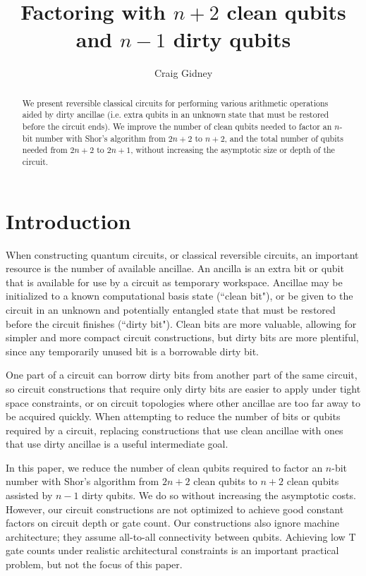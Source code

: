 \documentclass[twocolumn,longbibliography]{quantumarticle}
\title{Factoring with $n+2$ clean qubits and $n-1$ dirty qubits}
\author{Craig Gidney}
\affiliation{Google, Santa Barbara, CA 93117, USA}
\begin{document}
\maketitle

\begin{abstract}
We present reversible classical circuits for performing various arithmetic operations aided by dirty ancillae (i.e. extra qubits in an unknown state that must be restored before the circuit ends).
We improve the number of clean qubits needed to factor an $n$-bit number with Shor's algorithm \cite{Shor1999} from $2n+2$ \cite{takahashi2006, haner2016} to $n+2$, and the total number of qubits needed from $2n+2$ to $2n+1$, without increasing the asymptotic size or depth of the circuit.
\end{abstract}

\section{Introduction} \label{sec:introduction}

When constructing quantum circuits, or classical reversible circuits, an important resource is the number of available ancillae.
An ancilla is an extra bit or qubit that is available for use by a circuit as temporary workspace.
Ancillae may be initialized to a known computational basis state (``clean bit"), or be given to the circuit in an unknown and potentially entangled state that must be restored before the circuit finishes (``dirty bit").
Clean bits are more valuable, allowing for simpler and more compact circuit constructions, but dirty bits are more plentiful, since any temporarily unused bit is a borrowable dirty bit.

One part of a circuit can borrow dirty bits from another part of the same circuit, so circuit constructions that require only dirty bits are easier to apply under tight space constraints, or on circuit topologies where other ancillae are too far away to be acquired quickly.
When attempting to reduce the number of bits or qubits required by a circuit, replacing constructions that use clean ancillae with ones that use dirty ancillae is a useful intermediate goal.

In this paper, we reduce the number of clean qubits required to factor an $n$-bit number with Shor's algorithm from $2n+2$ clean qubits \cite{takahashi2006, haner2016} to $n+2$ clean qubits assisted by $n-1$ dirty qubits.
We do so without increasing the asymptotic costs.
However, our circuit constructions are not optimized to achieve good constant factors on circuit depth or gate count.
Our constructions also ignore machine architecture; they assume all-to-all connectivity between qubits.
Achieving low T gate counts under realistic architectural constraints is an important practical problem, but not the focus of this paper.
\end{document}
